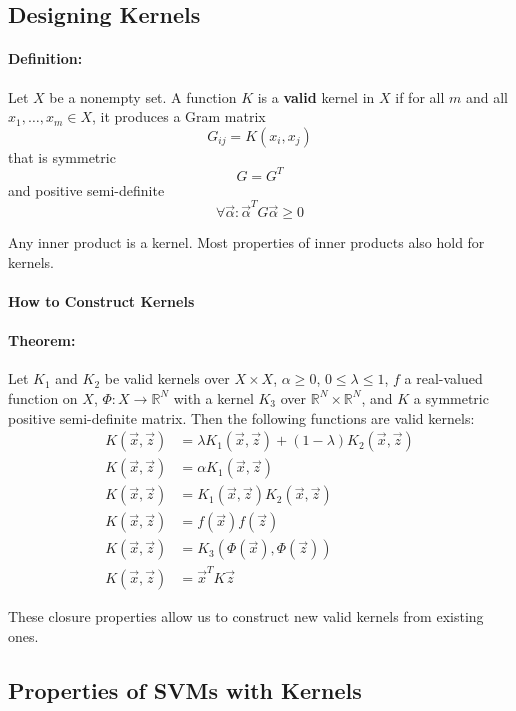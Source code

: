 \subsection{Designing Kernels}

\paragraph{Definition:}
Let $X$ be a nonempty set. A function $K$ is a \textbf{valid} kernel in $X$ if for all $m$ and all $x_1, \ldots, x_m \in X$, it produces a Gram matrix
\[
    G_{ij} = K(x_i, x_j)
\]
that is symmetric
\[
    G = G^T
\]
and positive semi-definite
\[
    \forall \vec{\alpha} : \vec{\alpha}^T G \vec{\alpha} \geq 0
\]

Any inner product is a kernel. Most properties of inner products also hold for kernels.

\paragraph{How to Construct Kernels}

\paragraph{Theorem:}
Let $K_1$ and $K_2$ be valid kernels over $X \times X$, $\alpha \geq 0$, $0 \leq \lambda \leq 1$, $f$ a real-valued function on $X$, $\Phi: X \to \mathbb{R}^N$ with a kernel $K_3$ over $\mathbb{R}^N \times \mathbb{R}^N$, and $K$ a symmetric positive semi-definite matrix. Then the following functions are valid kernels:
\begin{align*}
    K(\vec{x}, \vec{z}) &= \lambda K_1(\vec{x}, \vec{z}) + (1 - \lambda) K_2(\vec{x}, \vec{z}) \\
    K(\vec{x}, \vec{z}) &= \alpha K_1(\vec{x}, \vec{z}) \\
    K(\vec{x}, \vec{z}) &= K_1(\vec{x}, \vec{z}) K_2(\vec{x}, \vec{z}) \\
    K(\vec{x}, \vec{z}) &= f(\vec{x}) f(\vec{z}) \\
    K(\vec{x}, \vec{z}) &= K_3(\Phi(\vec{x}), \Phi(\vec{z})) \\
    K(\vec{x}, \vec{z}) &= \vec{x}^T K \vec{z}
\end{align*}

These closure properties allow us to construct new valid kernels from existing ones.

\subsection{Properties of SVMs with Kernels}

